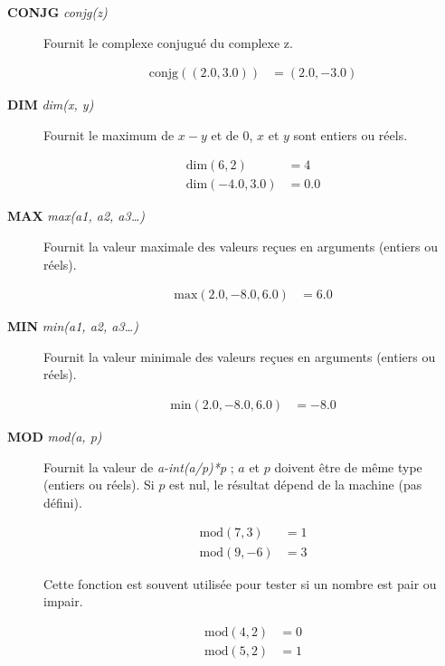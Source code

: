 \documentclass[a4paper,twoside]{article}
\begin{document}
\begin{description}

\item[\textbf{CONJG} \emph{conjg(z)}] Fournit le complexe conjugué du complexe z. 
\begin{exemple}
\begin{align}
\mathrm{conjg}((2.0,3.0))  &= (2.0,-3.0)
\end{align}
\end{exemple}

\item[\textbf{DIM} \emph{dim(x, y)}] Fournit le maximum de $x-y$ et de 0, $x$ et $y$ sont entiers ou réels. 
\begin{exemple}
\begin{align}
\mathrm{dim}(6,2)  &= 4\\
\mathrm{dim}(-4.0,3.0)  &= 0.0
\end{align}
\end{exemple}

\item[\textbf{MAX} \emph{max(a1, a2, a3\dots)}] Fournit la valeur maximale des valeurs reçues en arguments (entiers ou réels). 
\begin{exemple}
\begin{align}
\mathrm{max}(2.0, -8.0, 6.0)  &= 6.0
\end{align}
\end{exemple}

\item[\textbf{MIN} \emph{min(a1, a2, a3\dots)}] Fournit la valeur minimale des valeurs reçues en arguments (entiers ou réels). 
\begin{exemple}
\begin{align}
\mathrm{min}(2.0, -8.0, 6.0)  &= -8.0
\end{align}
\end{exemple}

\item[\textbf{MOD} \emph{mod(a, p)}] Fournit la valeur de \emph{a-int(a/p)*p} ; $a$ et $p$ doivent être de même type (entiers ou réels). Si $p$ est nul, le résultat dépend de la machine (pas défini). 
\begin{exemple}
\begin{align}
\mathrm{mod}(7,3)  &= 1\\
\mathrm{mod}(9,-6)  &= 3
\end{align}
\end{exemple}

Cette fonction est souvent utilisée pour tester si un nombre est pair ou impair. 
\begin{exemple}
\begin{align}
\mathrm{mod}(4,2)  &= 0\\
\mathrm{mod}(5,2)  &= 1
\end{align}
\end{exemple}


\end{description}
\end{document}
